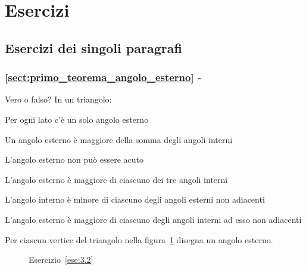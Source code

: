 
\section{Esercizi}

\subsection{Esercizi dei singoli paragrafi}

\begingroup
\hypersetup{linkcolor=black}
\subsubsection*{\ref{sect:primo_teorema_angolo_esterno} - 
}
\endgroup

\begin{esercizio}
\label{ese:3.1}
Vero o falso? In un triangolo:
\begin{enumeratea}
\item Per ogni lato c'è un solo angolo esterno\hfill\boxV\quad\boxF
\item Un angolo esterno è maggiore della somma degli angoli 
interni\hfill\boxV\quad\boxF
\item L'angolo esterno non può essere acuto\hfill\boxV\quad\boxF
\item L'angolo esterno è maggiore di ciascuno dei tre angoli 
interni\hfill\boxV\quad\boxF
\item L'angolo interno è minore di ciascuno degli angoli esterni non 
adiacenti\hfill\boxV\quad\boxF
\item L'angolo esterno è maggiore di ciascuno degli angoli interni ad 
esso non adiacenti\tab\tab\hfill\boxV\quad\boxF
\end{enumeratea}
\end{esercizio}

\begin{esercizio}
\label{ese:3.2}
Per ciascun vertice del triangolo nella figura~\ref{fig:ese3.2} 
disegna un angolo esterno.
\end{esercizio}


\begin{inaccessibleblock}
 \begin{figure}[htb]
\centering
\caption{Esercizio~\ref{ese:3.2}}\label{fig:ese3.2}
\end{figure}
\end{inaccessibleblock}

